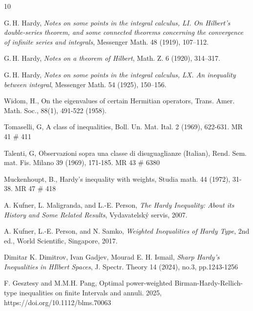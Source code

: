 \documentclass{amsart}
\theoremstyle{definition}
\theoremstyle{remark}
\numberwithin{equation}{section}
\begin{document}

\begin{thebibliography}{10}

G.\,H. Hardy, \textit{Notes on some points in the integral calculus, LI. On Hilbert's double-series
theorem, and some connected theorems concerning the convergence of infinite series and integrals}, Messenger Math. 48 (1919), 107--112.

G.\,H. Hardy, \textit{Notes on a theorem of Hilbert}, Math. Z. 6 (1920), 314--317.

G.\,H. Hardy, \textit{Notes on some points in the integral calculus, LX. An inequality between
integral}, Messenger Math. 54 (1925), 150--156. 

Widom, H., On the eigenvalues of certain Hermitian operators, Trans. Amer.
Math. Soc., 88(1), 491-522 (1958).

Tomaselli, G, A class of inequalities, Boll. Un. Mat. Ital. 2 (1969), 622-631. MR 41 \# 411

Talenti, G, Observazioni sopra una classe di disuguaglianze (Italian), Rend. Sem. mat. Fis. Milano 39 
(1969), 171-185. MR 43 \# 6380

Muckenhoupt, B., Hardy's inequality with weights, Studia math. 44 (1972), 31-38. MR 47 \# 418

A. Kufner, L. Maligranda, and L.-E. Person, \textit{The  Hardy
Inequality: About its History and Some Related Results},
Vydavatelsk\'{y} servis, 2007.

A. Kufner, L.-E. Person, and N. Samko, \textit{Weighted Inequalities of
Hardy Type}, 2nd ed., World Scientific, Singapore, 2017.

Dimitar K. Dimitrov, Ivan Gadjev, Mourad E. H. Ismail, \textit{Sharp Hardy's Inequalities in HIlbert Spaces}, J. Spectr. Theory 14 (2024), no.3, pp.1243-1256

F. Gesztesy and M.M.H. Pang, Optimal power-weighted Birman-Hardy-Rellich-type inequalities on finite Intervals and annuli. 2025, https://doi.org/10.1112/blms.70063




\end{thebibliography}
\end{document}
